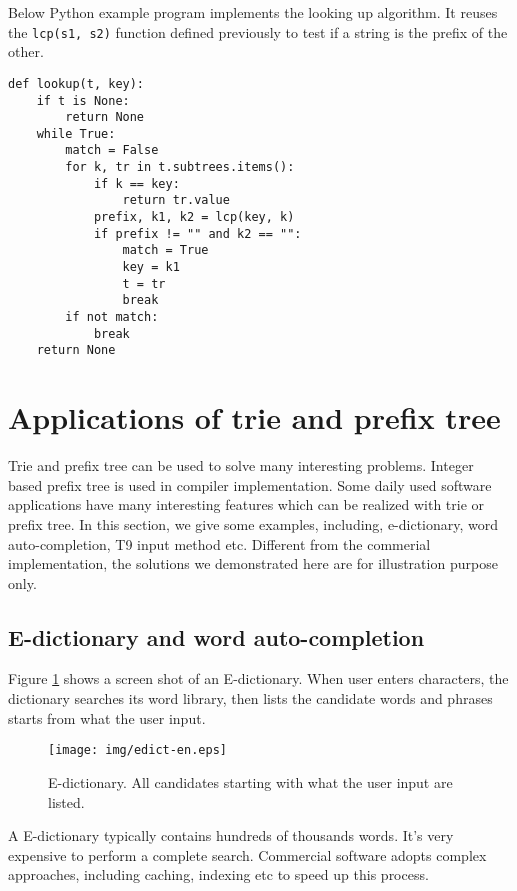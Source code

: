 \documentclass[b5paper]{article}
\begin{document}
Below Python example program implements the looking up algorithm.
It reuses the \texttt{lcp(s1, s2)} function
defined previously to test if a string is the prefix of the other.

\lstset{language=Python}
\begin{lstlisting}
def lookup(t, key):
    if t is None:
        return None
    while True:
        match = False
        for k, tr in t.subtrees.items():
            if k == key:
                return tr.value
            prefix, k1, k2 = lcp(key, k)
            if prefix != "" and k2 == "":
                match = True
                key = k1
                t = tr
                break
        if not match:
            break
    return None
\end{lstlisting}


\section{Applications of trie and prefix tree}

Trie and prefix tree can be used to solve many interesting problems.
Integer based prefix tree is used in compiler implementation. Some daily
used software applications have many interesting features which can be
realized with trie or prefix tree. In this section, we give some examples,
including, e-dictionary, word auto-completion, T9
input method etc. Different from the commerial implementation, the
solutions we demonstrated here are for illustration purpose
only.

\subsection{E-dictionary and word auto-completion}
Figure \ref{fig:e-dict} shows a screen shot of an E-dictionary.
When user enters characters,
the dictionary searches its word library, then lists the candidate words and
phrases starts from what the user input.

\begin{figure}[htbp]
  \centering
  \texttt{[image: img/edict-en.eps]}
  \caption{E-dictionary. All candidates starting with what the user input are listed.}
  \label{fig:e-dict}
\end{figure}

A E-dictionary typically contains hundreds of thousands words. It's very expensive
to perform a complete search. Commercial software adopts complex approaches, including
caching, indexing etc to speed up this process.
\end{document}
